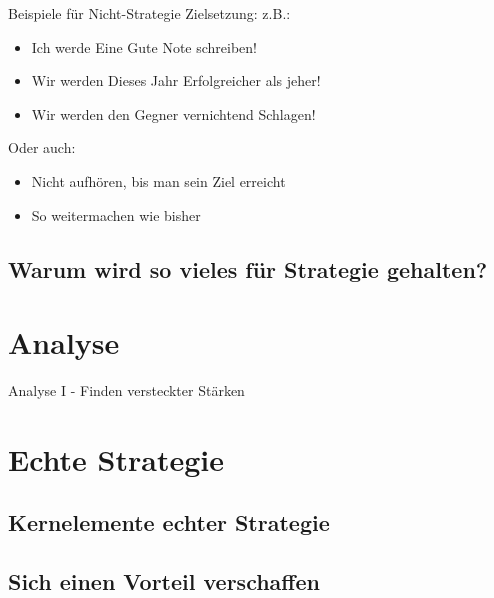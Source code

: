 \documentclass[12pt,compress,ngerman,utf8,t]{beamer}
\begin{document}
\begin{frame}[c]{Beispiele für Nicht-Strategie}
    Zielsetzung: z.B.: \pause
    \begin{itemize}
        \item Ich werde Eine Gute Note schreiben! \pause
        \item Wir werden Dieses Jahr Erfolgreicher als jeher! \pause
        \item Wir werden den Gegner vernichtend Schlagen! \pause
    \end{itemize}


    Oder auch:
    \begin{itemize}
        \item Nicht aufhören, bis man sein Ziel erreicht \pause
        \item So weitermachen wie bisher
    \end{itemize}
\end{frame}

\subsection{Warum wird so vieles für Strategie gehalten?}



\section{Analyse}
\begin{frame}{Analyse I - Finden versteckter Stärken}
\end{frame}


\section{Echte Strategie}
\subsection{Kernelemente echter Strategie}
\subsection{Sich einen Vorteil verschaffen}
\end{document}
